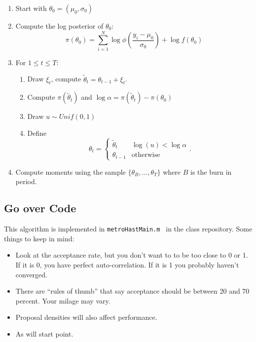 \documentclass[twoside]{article}
\begin{document}
\begin{enumerate}
\item Start with $\theta_0 = (\mu_0, \sigma_0)$
\item Compute the log posterior of $\theta_0$:
$$ \pi(\theta_0) = \sum_{i=1}^N \log \phi \left( \frac{y_i - \mu_0}{\sigma_0} \right)  + \log f(\theta_0) $$
\item For $1 \leq t \leq T$: 
\begin{enumerate}
\item Draw $\xi_t$, compute $\tilde{\theta}_t = \theta_{t-1} + \xi_t$. 
\item Compute $\pi(\tilde{\theta}_t)$ and $\log \alpha =  \pi(\tilde{\theta}_t) - \pi(\theta_0)$
\item Draw $u \sim Unif(0,1)$
\item Define
$$ \theta_t = 
\begin{cases}
\tilde{\theta}_t & \log(u) < \log \alpha \\
\theta_{t-1} & \mbox{otherwise}
\end{cases}. $$
\end{enumerate}
\item Compute moments using the sample $\{\theta_B, \ldots, \theta_T\}$ where $B$ is the burn in period. 
\end{enumerate}

\subsection{Go over Code}
This algorithm is implemented in {\tt metroHastMain.m } in the class repository.
Some things to keep in mind: 
\begin{itemize}
\item Look at the acceptance rate, but you don't want to to be too close to 0 or 1. If it is 0, you have perfect auto-correlation. If it is 1 you probably haven't converged. 
\item There are ``rules of thumb'' that say acceptance should be between 20 and 70 percent. Your milage may vary. 
\item Proposal densities will also affect performance. 
\item As will start point. 
\end{itemize}
\end{document}
